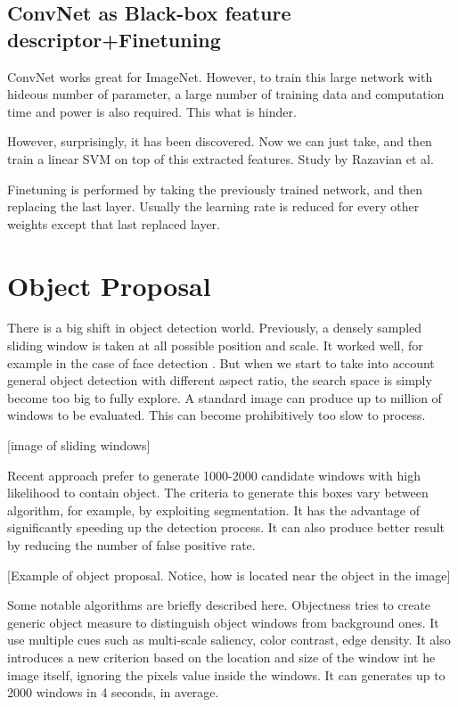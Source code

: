 \documentclass[a4paper,11pt]{kth-mag}
\begin{document}
\subsection{ConvNet as Black-box feature descriptor+Finetuning}
ConvNet works great for ImageNet. However, to train this large network with hideous number of parameter, a large number of training data and computation time and power is also required. This what is hinder.

However, surprisingly, it has been discovered. Now we can just take, and then train a linear SVM on top of this extracted features.
Study by Razavian et al. \cite{razavian}

Finetuning is performed by taking the previously trained network, and then replacing the last layer. Usually the learning rate is reduced for every other weights except that last replaced layer.

\section{Object Proposal}
There is a big shift in object detection world. Previously, a densely sampled sliding window is taken at all possible position and scale. It worked well, for example in the case of face detection \cite{violajones}. But when we start to take into account general object detection with different aspect ratio, the search space is simply become too big to fully explore. A standard image can produce up to million of windows to be evaluated. This can become prohibitively too slow to process.

[image of sliding windows]

Recent approach prefer to generate 1000-2000 candidate windows with high likelihood to contain object. The criteria to generate this boxes vary between algorithm, for example, by exploiting segmentation. It has the advantage of significantly speeding up the detection process. It can also produce better result by reducing the number of false positive rate.

[Example of object proposal. Notice, how is located near the object in the image]

Some notable algorithms are briefly described here.
Objectness \cite{alexe2012objectness} tries to create generic object measure to distinguish object windows from background ones. It use multiple cues such as multi-scale saliency, color contrast, edge density. It also introduces a new criterion based on the location and size of the window int he image itself, ignoring the pixels value inside the windows. It can generates up to 2000 windows in 4 seconds, in average.
\end{document}
